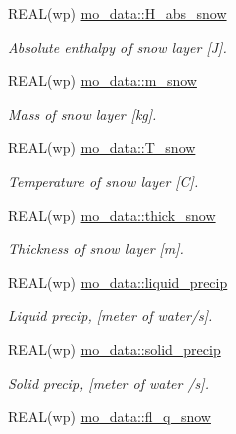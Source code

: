 \begin{DoxyCompactItemize}
REAL(wp) \hyperlink{namespacemo__data_a01f72ce0ba7168d410a2a683c2579e2d}{mo\_\-data::H\_\-abs\_\-snow}
\begin{DoxyCompactList}\small\item\em Absolute enthalpy of snow layer \mbox{[}J\mbox{]}. \item\end{DoxyCompactList}\item 
REAL(wp) \hyperlink{namespacemo__data_abda43178412f35b4871bbfe89bc3eb12}{mo\_\-data::m\_\-snow}
\begin{DoxyCompactList}\small\item\em Mass of snow layer \mbox{[}kg\mbox{]}. \item\end{DoxyCompactList}\item 
REAL(wp) \hyperlink{namespacemo__data_a6d032201ee2f7b716badb13643daf93e}{mo\_\-data::T\_\-snow}
\begin{DoxyCompactList}\small\item\em Temperature of snow layer \mbox{[}C\mbox{]}. \item\end{DoxyCompactList}\item 
REAL(wp) \hyperlink{namespacemo__data_a21342bcdb92f398a57a8eef77c77191a}{mo\_\-data::thick\_\-snow}
\begin{DoxyCompactList}\small\item\em Thickness of snow layer \mbox{[}m\mbox{]}. \item\end{DoxyCompactList}\item 
REAL(wp) \hyperlink{namespacemo__data_ace52326d57ce881a5017a47fed1c5a17}{mo\_\-data::liquid\_\-precip}
\begin{DoxyCompactList}\small\item\em Liquid precip, \mbox{[}meter of water/s\mbox{]}. \item\end{DoxyCompactList}\item 
REAL(wp) \hyperlink{namespacemo__data_a4dee26c05c4bcb3d685c7a24ba41bf63}{mo\_\-data::solid\_\-precip}
\begin{DoxyCompactList}\small\item\em Solid precip, \mbox{[}meter of water /s\mbox{]}. \item\end{DoxyCompactList}\item 
REAL(wp) \hyperlink{namespacemo__data_ab90ffe7683553449ecf8c78d478cb40e}{mo\_\-data::fl\_\-q\_\-snow}

\end{DoxyCompactItemize}
